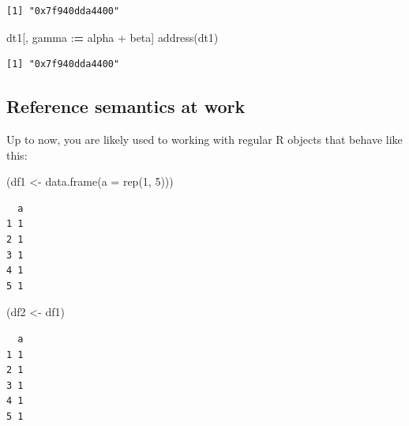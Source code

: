 \documentclass[
]{book}
\newenvironment{Shaded}{\begin{snugshade}}{\end{snugshade}}
\newcommand{\AttributeTok}[1]{\textcolor[rgb]{0.77,0.63,0.00}{#1}}
\newcommand{\DecValTok}[1]{\textcolor[rgb]{0.00,0.00,0.81}{#1}}
\newcommand{\ErrorTok}[1]{\textcolor[rgb]{0.64,0.00,0.00}{\textbf{#1}}}
\newcommand{\FunctionTok}[1]{\textcolor[rgb]{0.00,0.00,0.00}{#1}}
\newcommand{\NormalTok}[1]{#1}
\newcommand{\OtherTok}[1]{\textcolor[rgb]{0.56,0.35,0.01}{#1}}
\newcommand{\SpecialCharTok}[1]{\textcolor[rgb]{0.00,0.00,0.00}{#1}}
\begin{document}
\begin{verbatim}
[1] "0x7f940dda4400"
\end{verbatim}

\begin{Shaded}
\begin{Highlighting}[]
\NormalTok{dt1[, gamma }\SpecialCharTok{:}\ErrorTok{=}\NormalTok{ alpha }\SpecialCharTok{+}\NormalTok{ beta]}
\FunctionTok{address}\NormalTok{(dt1)}
\end{Highlighting}
\end{Shaded}

\begin{verbatim}
[1] "0x7f940dda4400"
\end{verbatim}

\hypertarget{reference-semantics-at-work}{%
\subsection{Reference semantics at work}\label{reference-semantics-at-work}}

Up to now, you are likely used to working with regular R objects that behave like this:

\begin{Shaded}
\begin{Highlighting}[]
\NormalTok{(df1 }\OtherTok{\textless{}{-}} \FunctionTok{data.frame}\NormalTok{(}\AttributeTok{a =} \FunctionTok{rep}\NormalTok{(}\DecValTok{1}\NormalTok{, }\DecValTok{5}\NormalTok{)))}
\end{Highlighting}
\end{Shaded}

\begin{verbatim}
  a
1 1
2 1
3 1
4 1
5 1
\end{verbatim}

\begin{Shaded}
\begin{Highlighting}[]
\NormalTok{(df2 }\OtherTok{\textless{}{-}}\NormalTok{ df1)}
\end{Highlighting}
\end{Shaded}

\begin{verbatim}
  a
1 1
2 1
3 1
4 1
5 1
\end{verbatim}

\begin{Shaded}
\end{Shaded}
\end{document}
